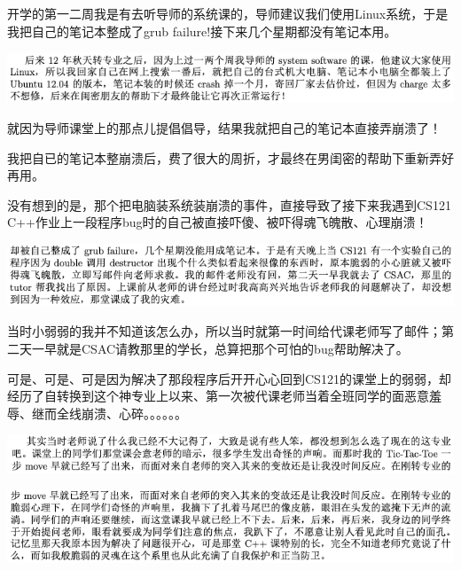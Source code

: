 \documentclass[9pt, b5paper]{article}
\begin{document}
开学的第一二周我是有去听导师的系统课的，导师建议我们使用Linux系统，于是我把自己的笔记本整成了grub failure!接下来几个星期都没有笔记本用。

\begin{center}
\includegraphics[width=.9\linewidth]{./pic/backups_plans_20210425_125121.png}
\end{center}

就因为导师课堂上的那点儿提倡倡导，结果我就把自己的笔记本直接弄崩溃了！

我把自已的笔记本整崩溃后，费了很大的周折，才最终在男闺密的帮助下重新弄好再用。

没有想到的是，那个把电脑装系统装崩溃的事件，直接导致了接下来我遇到CS121 C++作业上一段程序bug时的自己被直接吓傻、被吓得魂飞魄散、心理崩溃！

\begin{center}
\includegraphics[width=.9\linewidth]{./pic/backups_plans_20210424_203454.png}
\end{center}

当时小弱弱的我并不知道该怎么办，所以当时就第一时间给代课老师写了邮件；第二天一早就是CSAC请教那里的学长，总算把那个可怕的bug帮助解决了。

可是、可是、可是因为解决了那段程序后开开心心回到CS121的课堂上的弱弱，却经历了自转换到这个神专业上以来、第一次被代课老师当着全班同学的面恶意羞辱、继而全线崩溃、心碎。。。。。。

\begin{center}
\includegraphics[width=.9\linewidth]{./pic/backups_plans_20210424_203548.png}
\end{center}

\begin{center}
\includegraphics[width=.9\linewidth]{./pic/backups_plans_20210424_203612.png}
\end{center}
\end{document}
